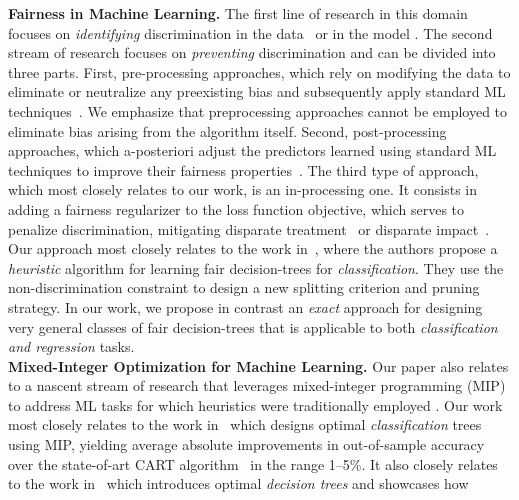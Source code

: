 \documentclass[letterpaper]{article} %
\theoremstyle{definition}
\newcommand{\1}{\ensuremath{{\rm e}}} %
\begin{document}
\textbf{Fairness in Machine Learning.} The first line of research in this domain focuses on \emph{identifying} discrimination in the data~\cite{Pedreshi:2008} or in the model \cite{Adler:2018:ABM:3182400.3182507}. The second stream of research focuses on \emph{preventing} discrimination and can be divided into three parts. First, pre-processing approaches, which rely on modifying the data to eliminate or neutralize any preexisting bias and subsequently apply standard ML techniques~\cite{Kamiran2012,Kamiran2009classnodiscr,Luong:2011}. We emphasize that preprocessing approaches cannot be employed to eliminate bias arising from the algorithm itself. Second, post-processing approaches, which a-posteriori adjust the predictors learned using standard ML techniques to improve their fairness properties~\cite{Hardt:2016,Fish:2016}. The third type of approach, which most closely relates to our work, is an in-processing one. It consists in adding a fairness regularizer to the loss function objective, which serves to penalize discrimination, mitigating disparate treatment~\cite{Dwork:2012:FTA:2090236.2090255,pmlr-v28-zemel13,Berk:2017} or disparate impact~\cite{Calders:2010,Kamiran:2010}. Our approach most closely relates to the work in~\cite{Kamiran:2010}, where the authors propose a \emph{heuristic} algorithm for learning fair decision-trees for \emph{classification}. They use the non-discrimination constraint to design a new splitting criterion and pruning strategy. In our work, we propose in contrast an \emph{exact} approach for designing very general classes of fair decision-trees that is applicable to both \emph{classification and regression} tasks. \\ 
%
\textbf{Mixed-Integer Optimization for Machine Learning.} Our paper also relates to a nascent stream of research that leverages mixed-integer programming (MIP) to address ML tasks for which heuristics were traditionally employed \cite{Bertsimas:2015,Lou:2013,Mazumder:2015,Bertsimas2017,verwer2017}. Our work most closely relates to the work in~\cite{Bertsimas2017} which designs optimal \emph{classification} trees using MIP, yielding average absolute improvements in out-of-sample accuracy over the state-of-art CART algorithm~\cite{breiman1984classification} in the range 1–5\%. It also closely relates to the work in~\cite{verwer2017} which introduces optimal \emph{decision trees} and showcases how 
\end{document}
